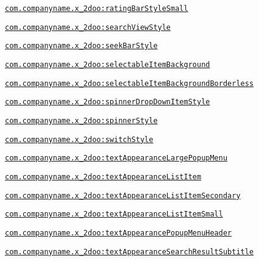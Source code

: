 {\tt \hyperlink{classandroid_1_1support_1_1v4_1_1_r_1_1styleable_267c7cd6a0c6a2c317ac9a33722b06eb}{com.companyname.x\_\-2doo:ratingBarStyleSmall}}

{\tt \hyperlink{classandroid_1_1support_1_1v4_1_1_r_1_1styleable_4c487a848b41d29bf3dc21719d968cd6}{com.companyname.x\_\-2doo:searchViewStyle}}

{\tt \hyperlink{classandroid_1_1support_1_1v4_1_1_r_1_1styleable_feb452e918c5ee9d2dc74ac8a5370e9d}{com.companyname.x\_\-2doo:seekBarStyle}}

{\tt \hyperlink{classandroid_1_1support_1_1v4_1_1_r_1_1styleable_ca3ef3993e097a2b6d8407610c33068d}{com.companyname.x\_\-2doo:selectableItemBackground}}

{\tt \hyperlink{classandroid_1_1support_1_1v4_1_1_r_1_1styleable_113f8fa7701e681a079ae443df1e2758}{com.companyname.x\_\-2doo:selectableItemBackgroundBorderless}}

{\tt \hyperlink{classandroid_1_1support_1_1v4_1_1_r_1_1styleable_2214d9a18b7e5f85a1399a543215d936}{com.companyname.x\_\-2doo:spinnerDropDownItemStyle}}

{\tt \hyperlink{classandroid_1_1support_1_1v4_1_1_r_1_1styleable_07bdf94f02decf6c8be39649927ee6ad}{com.companyname.x\_\-2doo:spinnerStyle}}

{\tt \hyperlink{classandroid_1_1support_1_1v4_1_1_r_1_1styleable_b500f751fdb168654edc56fa5b3f9455}{com.companyname.x\_\-2doo:switchStyle}}

{\tt \hyperlink{classandroid_1_1support_1_1v4_1_1_r_1_1styleable_96bd7ab78a1b2db3505d8f14a3ca0737}{com.companyname.x\_\-2doo:textAppearanceLargePopupMenu}}

{\tt \hyperlink{classandroid_1_1support_1_1v4_1_1_r_1_1styleable_942cd40a2b7ea9d627e07dc8a7b02152}{com.companyname.x\_\-2doo:textAppearanceListItem}}

{\tt \hyperlink{classandroid_1_1support_1_1v4_1_1_r_1_1styleable_c4014b38c2c4cc12f0ebf7d747ad85fc}{com.companyname.x\_\-2doo:textAppearanceListItemSecondary}}

{\tt \hyperlink{classandroid_1_1support_1_1v4_1_1_r_1_1styleable_e4cba9e6e74a50e8866c825124a656b8}{com.companyname.x\_\-2doo:textAppearanceListItemSmall}}

{\tt \hyperlink{classandroid_1_1support_1_1v4_1_1_r_1_1styleable_3eaecb6b4885a61e22337bd4cace8963}{com.companyname.x\_\-2doo:textAppearancePopupMenuHeader}}

{\tt \hyperlink{classandroid_1_1support_1_1v4_1_1_r_1_1styleable_62807726d61e458ec15ee48dbbc82a3e}{com.companyname.x\_\-2doo:textAppearanceSearchResultSubtitle}}

